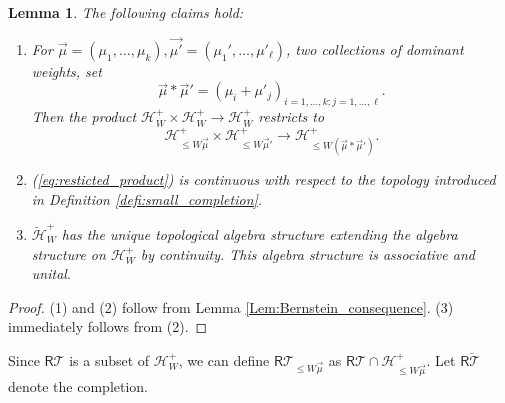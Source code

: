 \documentclass{amsart}
\newcommand{\Hecke}{\mathcal{H}}
\newcommand{\Ring}{\mathsf{R}}
\newtheorem{Lem}[Thm]{Lemma}
\theoremstyle{definition}
\numberwithin{equation}{section}
\begin{document}
\begin{Lem}\label{Lem:small_completion_algebra}
The following claims hold:
\begin{enumerate}
\item For $\vec{\mu}=(\mu_1,\ldots,\mu_k), \vec{\mu'}=(\mu_1',\ldots,\mu'_\ell)$, two collections of dominant weights, set $$\vec{\mu}*\vec{\mu}'=(\mu_i+\mu'_j)_{i=1,\ldots,k; j=1,\ldots,\ell}.$$
Then the product $\Hecke^+_W\times \Hecke^+_W\rightarrow \Hecke^+_W$ restricts to
\begin{equation}\label{eq:resticted_product}
\Hecke^+_{\leqslant W\vec{\mu}}\times \Hecke^+_{\leqslant W\vec{\mu}'}\rightarrow \Hecke^+_{\leqslant W(\vec{\mu}*\vec{\mu}')}.
\end{equation}
\item (\ref{eq:resticted_product}) is continuous with respect to the topology introduced in
Definition \ref{defi:small_completion}.
\item $\breve{\Hecke}^+_W$ has the unique topological algebra structure extending the algebra structure on $\Hecke^+_W$ by continuity. This algebra structure is associative and unital.
\end{enumerate}
\end{Lem}
\begin{proof}
(1) and (2) follow from Lemma \ref{Lem:Bernstein_consequence}.   (3) immediately follows from (2).
\end{proof}

Since $\Ring \mathcal{T}$ is a subset of $\Hecke^+_W$, we can define $\Ring\mathcal{T}_{\leqslant W\vec{\mu}}$ as
$\Ring\mathcal{T}\cap \Hecke^+_{\leqslant W\vec{\mu}}$. Let $\Ring\breve{\mathcal{T}}$ denote the completion.
\end{document}
